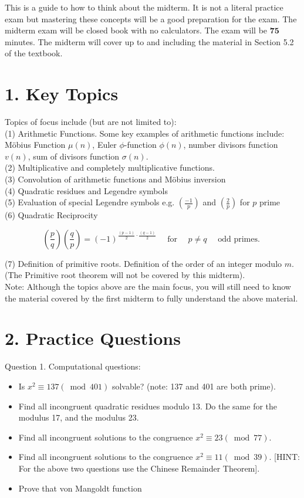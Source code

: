 \documentclass[10pt]{article}
\begin{document}
This is a guide to how to think about the midterm. It is not a literal practice exam but mastering these concepts will be a good preparation for the exam. The midterm exam will be closed book with no calculators. The exam will be $\mathbf{7 5}$ minutes. The midterm will cover up to and including the material in Section 5.2 of the textbook.

\section*{1. Key Topics}
Topics of focus include (but are not limited to):\\
(1) Arithmetic Functions. Some key examples of arithmetic functions include: Möbius Function $\mu(n)$, Euler $\phi$-function $\phi(n)$, number divisors function $v(n)$, sum of divisors function $\sigma(n)$.\\
(2) Multiplicative and completely multiplicative functions.\\
(3) Convolution of arithmetic functions and Möbius inversion\\
(4) Quadratic residues and Legendre symbols\\
(5) Evaluation of special Legendre symbols e.g. $\left(\frac{-1}{p}\right)$ and $\left(\frac{2}{p}\right)$ for $p$ prime\\
(6) Quadratic Reciprocity

$$
\left(\frac{p}{q}\right)\left(\frac{q}{p}\right)=(-1)^{\frac{(p-1)}{2} \cdot \frac{(q-1)}{2}} \quad \text { for } \quad p \neq q \quad \text { odd primes. }
$$

(7) Definition of primitive roots. Definition of the order of an integer modulo $m$. (The Primitive root theorem will not be covered by this midterm).\\
Note: Although the topics above are the main focus, you will still need to know the material covered by the first midterm to fully understand the above material.

\section*{2. Practice Questions}
Question 1. Computational questions:

\begin{itemize}
  \item Is $x^{2} \equiv 137(\bmod 401)$ solvable? (note: 137 and 401 are both prime).
  \item Find all incongruent quadratic residues modulo 13. Do the same for the modulus 17, and the modulus 23.
  \item Find all incongruent solutions to the congruence $x^{2} \equiv 23(\bmod 77)$.
  \item Find all incongruent solutions to the congruence $x^{2} \equiv 11(\bmod 39)$. [HINT: For the above two questions use the Chinese Remainder Theorem].
  \item Prove that von Mangoldt function
\end{itemize}
\end{document}
